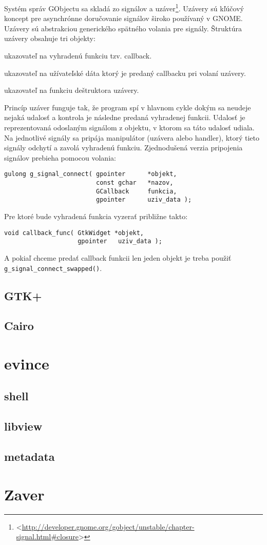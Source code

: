 \documentclass[12pt,oneside,final]{fithesis2}
\begin{document}
Systém správ GObjectu sa skladá zo signálov a uzáver\footnote{<\url{http://developer.gnome.org/gobject/unstable/chapter-signal.html\#closure}>}. Uzávery sú kľúčový koncept pre asynchrónne doručovanie signálov široko používaný v GNOME. Uzávery sú abstrakciou generického spätného volania pre signály. Štruktúra uzávery obsahuje tri objekty:
\begin{description}
\item ukazovateľ na vyhradenú funkciu tzv. callback.
\item ukazovateľ na užívateľské dáta ktorý je predaný callbacku pri volaní uzávery.
\item ukazovateľ na funkciu deštruktora uzávery.
\end{description}
Princíp uzáver funguje tak, že program spí v hlavnom cykle dokým sa neudeje nejaká udalosť a kontrola je následne predaná vyhradenej funkcii. Udalosť je reprezentovaná odoslaným signálom z objektu, v ktorom sa táto udalosť udiala. Na jednotlivé signály sa pripája manipulátor (uzávera alebo handler), ktorý tieto signály odchytí a zavolá vyhradenú funkciu. Zjednodušená verzia pripojenia signálov prebieha pomocou volania:
\begin{verbatim}
gulong g_signal_connect( gpointer      *objekt,
                         const gchar   *nazov,
                         GCallback     funkcia,
                         gpointer      uziv_data );
\end{verbatim} Pre ktoré bude vyhradená funkcia vyzerať približne takto: 
\begin{verbatim}
void callback_func( GtkWidget *objekt,
                    gpointer   uziv_data );
\end{verbatim}
A pokiaľ chceme predať callback funkcii len jeden objekt je treba použiť \verb|g_signal_connect_swapped()|.

\section{GTK+}
\section{Cairo}
\chapter{evince}
\section{shell}
\section{libview}
\section{metadata}
\chapter{Zaver}


\end{document}

